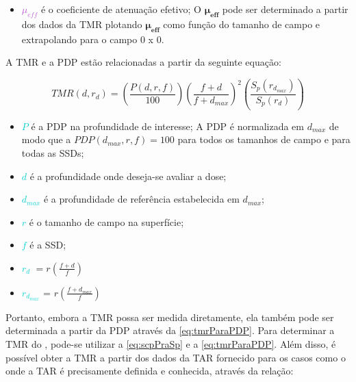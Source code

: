 \documentclass[11pt,a4paper]{article}
\newcounter{exemplo}
\begin{document}
    \begin{exemplo}[onde:]
        \begin{itemize}
            \item \textcolor{MediumOrchid}{$\mu_{eff}$} é o coeficiente de atenuação efetivo; O $\mathbf{\mu_{eff}}$ pode ser determinado a partir dos dados da TMR plotando $\mathbf{\mu_{eff}}$ como função do tamanho de campo e extrapolando para o campo 0 x 0. 
        \end{itemize}
    \end{exemplo}

    A TMR e a PDP estão relacionadas a partir da seguinte equação:

        \begin{equation}
            TMR(d, r_d) = \left(\frac{P(d, r, f)}{100}\right)\left(\frac{f + d}{f + d_{max}}\right)^2 \left(\frac{S_p(r_{d_{max}})}{S_p(r_{d})}\right)
            \label{eq:tmrParaPDP}
        \end{equation}

        \begin{exemplo}[onde:]
            \begin{itemize}
                \item \textcolor{DarkTurquoise}{$P$} é a PDP na profundidade de interesse; A PDP é normalizada em $d_{max}$ de modo que a $PDP(d_{max}, r, f) = 100$ para todos os tamanhos de campo e para todas as SSDs;
                \item \textcolor{DarkTurquoise}{$d$} é a profundidade onde deseja-se avaliar a dose;
                \item \textcolor{DarkTurquoise}{$d_{max}$} é a profundidade de referência estabelecida em $d_{max}$; 
                \item \textcolor{DarkTurquoise}{$r$} é o tamanho de campo na superfície;
                \item \textcolor{DarkTurquoise}{$f$} é a SSD;
                \item \textcolor{DarkTurquoise}{$r_d$} $= r \left(\frac{f + d}{f}\right)$
                \item \textcolor{DarkTurquoise}{$r_{d_{max}}$} = $r\left(\frac{f + d_{max}}{f}\right)$
            \end{itemize}
        \end{exemplo}

    Portanto, embora a TMR possa ser medida diretamente, ela também pode ser determinada a partir da PDP através da \ref{eq:tmrParaPDP}. Para determinar a TMR do , pode-se utilizar a \ref{eq:scpPraSp}  e a \ref{eq:tmrParaPDP}. Além disso, é possível obter a TMR a partir dos dados da TAR fornecido para os casos como o  onde a TAR é precisamente definida e conhecida, através da relação:
\end{document}
